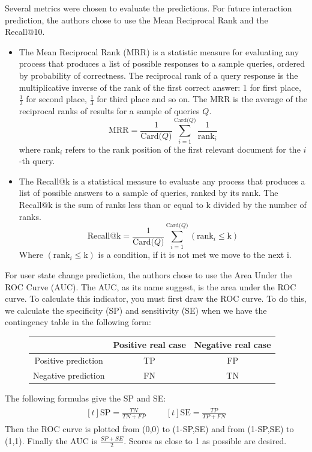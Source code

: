 Several metrics were chosen to evaluate the predictions. For future interaction prediction, the authors chose to use the Mean Reciprocal Rank and the Recall@10.
\begin{itemize}
    \item The Mean Reciprocal Rank (MRR) is a statistic measure for evaluating any process that produces a list of possible responses to a sample queries, ordered by probability of correctness. The reciprocal rank of a query response is the multiplicative inverse of the rank of the first correct answer: 1 for first place, $\frac{1}{2}$ for second place, $\frac{1}{3}$ for third place and so on. The MRR is the average of the reciprocal ranks of results for a sample of queries $Q$.
    $$
    \text{MRR} = \frac{1}{\text{Card(}Q\text{)}} \sum_{i=1}^{\text{Card(}Q\text{)}} \frac{1}{\text{rank}_i}
    $$
    where rank$_i$ refers to the rank position of the first relevant document for the $i$-th query.
    \item The Recall@k is a statistical measure to evaluate any process that produces a list of possible answers to a sample of queries, ranked by its rank. The Recall@k is the sum of ranks less than or equal to k divided by the number of ranks.
    $$
    \text{Recall@k} = \frac{1}{\text{Card(}Q\text{)}} \sum_{i=1}^{\text{Card(}Q\text{)}} \left ( \text{rank}_i \leq \text{k} \right )
    $$
    Where $\left ( \text{rank}_i \leq \text{k} \right )$ is a condition, if it is not met we move to the next i.
\end{itemize}

For user state change prediction, the authors chose to use the Area Under the ROC Curve (AUC). The AUC, as its name suggest, is the area under the ROC curve. To calculate this indicator, you must first draw the ROC curve. To do this, we calculate the specificity (SP) and sensitivity (SE) when we have the contingency table in the following form:
\begin{figure}[H]
    \centering
    \begin{tabular}{|c|c|c|}
        \hline
         & Positive real case & Negative real case \\\hline
         Positive prediction & TP & FP \\\hline
         Negative prediction & FN & TN \\\hline
    \end{tabular}
\end{figure}
The following formulas give the SP and SE:
\begin{align*}
    \begin{aligned}[t]
        \text{SP} = \frac{TN}{TN+FP}
    \end{aligned}&&
    \begin{aligned}[t]
        \text{SE} = \frac{TP}{TP+FN}
    \end{aligned}
\end{align*}
Then the ROC curve is plotted from (0,0) to (1-SP,SE) and from (1-SP,SE) to (1,1). Finally the AUC is $\frac{SP+SE}{2}$. Scores as close to 1 as possible are desired.

